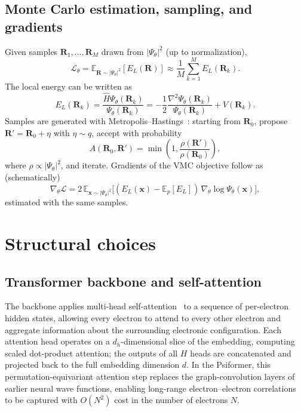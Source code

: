 \subsection{Monte Carlo estimation, sampling, and gradients}

Given samples $\mathbf{R}_1,\dots,\mathbf{R}_M$ drawn from $|\Psi_\theta|^2$ (up to normalization),
\begin{equation}
	\mathcal{L}_\theta
	=\mathbb{E}_{\mathbf{R}\sim |\Psi_\theta|^2}[E_L(\mathbf{R})]
	\approx \frac{1}{M}\sum_{k=1}^{M} E_L(\mathbf{R}_k).
\end{equation}
The local energy can be written as
\begin{equation}
	E_L(\mathbf{R}_k)
	=\frac{\hat{H}\Psi_\theta(\mathbf{R}_k)}{\Psi_\theta(\mathbf{R}_k)}
	=-\frac{1}{2}\frac{\nabla^{2}\Psi_\theta(\mathbf{R}_k)}{\Psi_\theta(\mathbf{R}_k)}+V(\mathbf{R}_k).
\end{equation}
Samples are generated with Metropolis--Hastings~\cite{metropolis}: starting from $\mathbf{R}_0$, propose $\mathbf{R}'=\mathbf{R}_0+\eta$ with $\eta\sim q$, accept with probability
\begin{equation}
	A(\mathbf{R}_0,\mathbf{R}')=\min\left(1,\frac{\rho(\mathbf{R}')}{\rho(\mathbf{R}_0)}\right),
\end{equation}
where $\rho\propto|\Psi_\theta|^2$, and iterate. Gradients of the VMC objective follow as (schematically)
\begin{equation}
	\nabla_{\theta}\mathcal{L}
	=2\,\mathbb{E}_{\mathbf{x}\sim |\Psi_\theta|^2}\bigl[(E_L(\mathbf{x})-\mathbb{E}_p[E_L])\,\nabla_\theta\log\Psi_\theta(\mathbf{x})\bigr],
\end{equation}
estimated with the same samples.

\section{Structural choices}

\subsection{Transformer backbone and self-attention}

The backbone applies multi-head self-attention~\cite{attention} to a sequence of per-electron hidden states, allowing every electron to attend to every other electron and aggregate information about the surrounding electronic configuration. Each attention head operates on a $d_h$-dimensional slice of the embedding, computing scaled dot-product attention; the outputs of all $H$ heads are concatenated and projected back to the full embedding dimension $d$. In the Psiformer, this permutation-equivariant attention step replaces the graph-convolution layers of earlier neural wave functions, enabling long-range electron--electron correlations to be captured with $O(N^2)$ cost in the number of electrons $N$.

